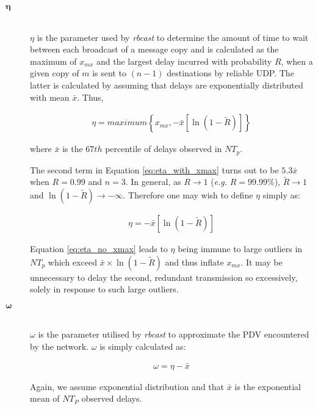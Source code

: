 \begin{description}
        \item[\Huge$\boldsymbol{\eta}$] \hfill \\
        $\eta$ is the parameter used by \emph{rbcast} to determine the amount of time to wait between each broadcast of a message copy and is calculated as the maximum of $x_{mx}$ and the largest delay incurred with probability $R$, when a given copy of $m$ is sent to $(n-1)$ destinations by reliable UDP.  The latter is calculated by assuming that delays are exponentially distributed with mean $\bar{x}$.  Thus,
        
        \begin{equation}
        \label{eq:eta_with_xmax}
            \begin{aligned}
                \eta = maximum \left\{ x_{mx}, -\bar{x}[\ln(1-\tilde{R})] \right\}
            \end{aligned}
        \end{equation}        
        
        where $\bar{x}$ is the $67th$ percentile of delays observed in $NT_p$.  
        
        The second term in Equation \ref{eq:eta_with_xmax} turns out to be $5.3\bar{x}$ when $R = 0.99$ and $n=3$.  In general, as $R \rightarrow 1$ (\emph{e.g.} $R = 99.99\%$), $\tilde{R} \rightarrow 1$ and $\ln(1-\tilde{R}) \rightarrow -\infty$.  Therefore one may wish to define $\eta$ simply as:
        
        \begin{equation}
        \label{eq:eta_no_xmax}
            \begin{aligned}
                \eta=-\bar{x}[\ln(1-\tilde{R})]  
            \end{aligned}
        \end{equation}
        
        Equation \ref{eq:eta_no_xmax} leads to $\eta$ being immune to large outliers in $NT_p$ which exceed $\bar{x} \times \ln(1 - \tilde{R})$ and thus inflate $x_{mx}$.  It may be unnecessary to delay the second, redundant transmission so excessively, solely in response to such large outliers.  

        \item[\Huge$\boldsymbol{\omega}$] \hfill \\
        $\omega$ is the parameter utilised by \emph{rbcast} to approximate the PDV encountered by the network.  $\omega$ is simply calculated as:
        
        \begin{equation}
            \begin{aligned}
                \omega = \eta - \bar{x}
            \end{aligned}
        \end{equation}        
        
        Again, we assume exponential distribution and that $\bar{x}$ is the exponential mean of $NT_P$ observed delays.
        \end{description}

